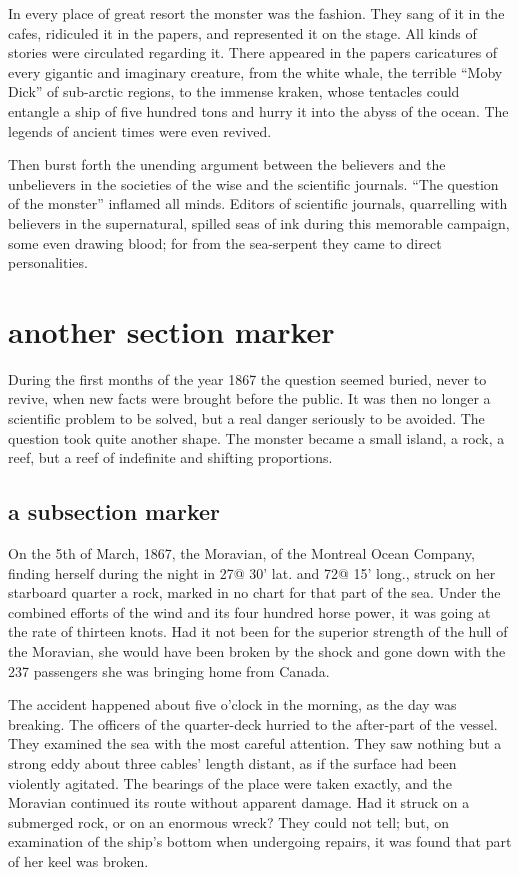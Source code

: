 In every place of great resort the monster was the fashion.
They sang of it in the cafes, ridiculed it in the papers, and represented
it on the stage.  All kinds of stories were circulated regarding it.
There appeared in the papers caricatures of every gigantic and
imaginary creature, from the white whale, the terrible ``Moby Dick''
of sub-arctic regions, to the immense kraken, whose tentacles could entangle
a ship of five hundred tons and hurry it into the abyss of the ocean.
The legends of ancient times were even revived.

Then burst forth the unending argument between the believers and the
unbelievers in the societies of the wise and the scientific journals.
``The question of the monster'' inflamed all minds.  Editors of
scientific journals, quarrelling with believers in the supernatural,
spilled seas of ink during this memorable campaign, some even drawing blood;
for from the sea-serpent they came to direct personalities.

\section{another section marker}

During the first months of the year 1867 the question seemed buried,
never to revive, when new facts were brought before the public.
It was then no longer a scientific problem to be solved, but a real
danger seriously to be avoided.  The question took quite another shape.
The monster became a small island, a rock, a reef, but a reef of indefinite
and shifting proportions.

\subsection{a subsection marker}

On the 5th of March, 1867, the Moravian, of the Montreal Ocean Company,
finding herself during the night in 27@ 30' lat.  and 72@ 15' long., struck
on her starboard quarter a rock, marked in no chart for that part of the sea.
Under the combined efforts of the wind and its four hundred horse power,
it was going at the rate of thirteen knots.  Had it not been for the superior
strength of the hull of the Moravian, she would have been broken by the shock
and gone down with the 237 passengers she was bringing home from Canada.

The accident happened about five o'clock in the morning, as the day
was breaking.  The officers of the quarter-deck hurried to the after-part
of the vessel.  They examined the sea with the most careful attention.
They saw nothing but a strong eddy about three cables' length distant,
as if the surface had been violently agitated.  The bearings of the place were
taken exactly, and the Moravian continued its route without apparent damage.
Had it struck on a submerged rock, or on an enormous wreck?  They could
not tell; but, on examination of the ship's bottom when undergoing repairs,
it was found that part of her keel was broken.

